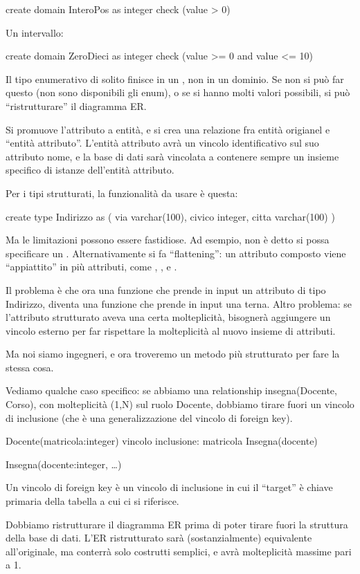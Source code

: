 create domain InteroPos as integer 
check (value > 0)

Un intervallo:

create domain ZeroDieci as integer
check (value >= 0 and value <= 10)

Il tipo enumerativo di solito finisce in un , non in un dominio. Se non si pu\`o far questo (non sono disponibili gli enum), o se si hanno molti valori possibili, si pu\`o ``ristrutturare'' il diagramma ER.

Si promuove l'attributo a entit\`a, e si crea una relazione fra entit\`a origianel e ``entit\`a attributo''. L'entit\`a attributo avr\`a un vincolo identificativo sul suo attributo nome, e la base di dati sar\`a vincolata a contenere sempre un insieme specifico di istanze dell'entit\`a attributo.

Per i tipi strutturati, la funzionalit\`a da usare \`e questa:

create type Indirizzo as (
    via varchar(100),
    civico integer,
    citta varchar(100)
)

Ma le limitazioni possono essere fastidiose. Ad esempio, non \`e detto si possa specificare un . Alternativamente si fa ``flattening'': un attributo composto viene ``appiattito'' in pi\`u attributi, come , , e .

Il problema \`e che ora una funzione che prende in input un attributo di tipo Indirizzo, diventa una funzione che prende in input una terna. Altro problema: se l'attributo strutturato aveva una certa molteplicit\`a, bisogner\`a aggiungere un vincolo esterno per far rispettare la molteplicit\`a al nuovo insieme di attributi.

Ma noi siamo ingegneri, e ora troveremo un metodo pi\`u strutturato per fare la stessa cosa.

Vediamo qualche caso specifico: se abbiamo una relationship insegna(Docente, Corso), con molteplicit\`a (1,N) sul ruolo Docente, dobbiamo tirare fuori un vincolo di inclusione (che \`e una generalizzazione del vincolo di foreign key).

Docente(matricola:integer)
vincolo inclusione: matricola \subseteq Insegna(docente)

Insegna(docente:integer, \ldots) 

Un vincolo di foreign key \`e un vincolo di inclusione in cui il ``target'' \`e chiave primaria della tabella a cui ci si riferisce.

Dobbiamo ristrutturare il diagramma ER prima di poter tirare fuori la struttura della base di dati. L'ER ristrutturato sar\`a (sostanzialmente) equivalente all'originale, ma conterr\`a solo costrutti semplici, e avr\`a molteplicit\`a massime pari a 1.

